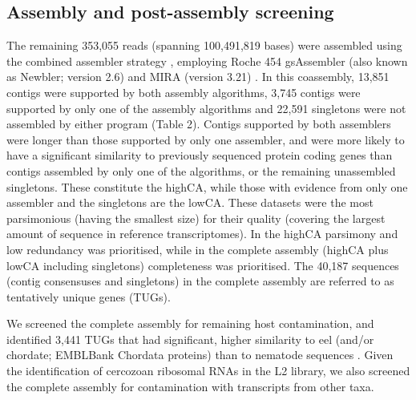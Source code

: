 \documentclass[10pt]{bmc_article}
\newenvironment{bmcformat}{\begin{raggedright}\baselineskip20pt\sloppy\setboolean{publ}{false}}{\end{raggedright}\baselineskip20pt\sloppy}
\begin{document}
\begin{bmcformat}
\subsection*{Assembly and post-assembly screening}


The remaining 353,055 reads (spanning
100,491,819 bases) were assembled using the combined assembler
strategy \cite{pmid20950480}, employing Roche 454 gsAssembler (also
known as Newbler; version 2.6) and MIRA (version 3.21)
\cite{miraEST}. In this coassembly, 13,851 contigs were
supported by both assembly algorithms, 3,745 contigs were
supported by only one of the assembly algorithms and 22,591
singletons were not assembled by either program (Table 2). Contigs
supported by both assemblers were longer than those supported by only
one assembler, and were more likely to have a significant similarity
to previously sequenced protein coding genes than contigs assembled by
only one of the algorithms, or the remaining unassembled
singletons. These constitute the highCA, while those with evidence
from only one assembler and the singletons are the lowCA. These
datasets were the most parsimonious (having the smallest size) for
their quality (covering the largest amount of sequence in reference
transcriptomes). In the highCA parsimony and low redundancy was
prioritised, while in the complete assembly (highCA plus lowCA
including singletons) completeness was prioritised. The 40,187
sequences (contig consensuses and singletons) in the complete assembly
are referred to as tentatively unique genes (TUGs).




We screened the complete assembly for remaining host contamination,
and identified 3,441 TUGs that had significant, higher
similarity to eel (and/or chordate; EMBLBank Chordata proteins) than
to nematode sequences \cite{pmid21550347}. Given the identification of
cercozoan ribosomal RNAs in the L2 library, we also screened the
complete assembly for contamination with transcripts from other taxa.


\end{bmcformat}
\end{document}

